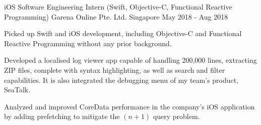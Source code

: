 

\begin{cventries}


	\cventry
		{iOS Software Engineering Intern (Swift, Objective-C, Functional Reactive Programming)} %
		{Garena Online Pte. Ltd.} %
		{Singapore} %
		{May 2018 - Aug 2018} %
		{
			\begin{cvitems}
				\item {Picked up Swift and iOS development, including Objective-C and Functional Reactive Programming without any prior background.}
				\item {Developed a localised log viewer app capable of handling 200,000 lines, extracting ZIP files, complete with syntax highlighting, as well as search and filter capabilities. It is also integrated the debugging menu of my team's product, SeaTalk.}
				\item {Analyzed and improved CoreData performance in the company's iOS application by adding prefetching to mitigate the $(n+1)$ query problem.}
			\end{cvitems}
		}


\end{cventries}
